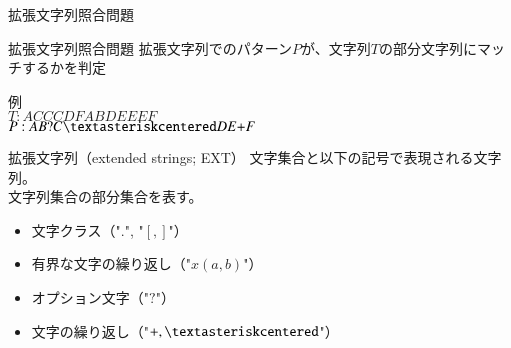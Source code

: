 \documentclass[dvipdfmx,12pt,beamer]{standalone}
\begin{document}
\begin{frame}{拡張文字列照合問題}
	\begin{block}{拡張文字列照合問題}
		拡張文字列でのパターン$P$が、文字列$T$の部分文字列にマッチするかを判定
	\end{block}
	例\\
	$T: ACCCDFABDEEEF$\\
	$P: AB?C\as DE\pl F$\\
\end{frame}
\begin{frame}
	\begin{block}{拡張文字列（extended strings; EXT）}
		文字集合と以下の記号で表現される文字列。\\文字列集合の部分集合を表す。
		\begin{itemize}
			\item 文字クラス（"$.$", "$[,]$"）
			\item 有界な文字の繰り返し（"$x(a, b)$"）
			\item オプション文字（"$?$"）
			\item 文字の繰り返し（"$\pl, \as$"）
		\end{itemize}
	\end{block}
\end{frame}
\end{document}
